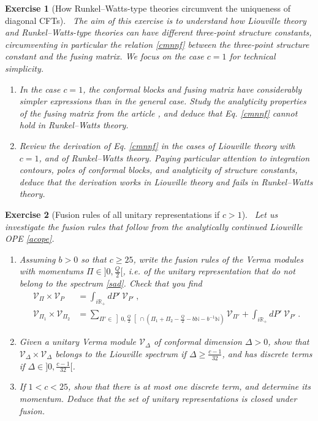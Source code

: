 \documentclass[12pt, a4paper, notitlepage, twoside]{report}
\numberwithin{equation}{section}
\theoremstyle{break}
\newtheorem{exo}{Exercise}[chapter]
\begin{document}
\begin{exo}[How Runkel--Watts-type theories circumvent the uniqueness of diagonal CFTs]
 ~\label{exonurw}
The aim of this exercise is to understand how Liouville theory and Runkel--Watts-type theories can have different three-point structure constants, circumventing in particular the relation \eqref{cmnnf} between the three-point structure constant and the fusing matrix. We focus on the case $c=1$ for technical simplicity. 
\begin{enumerate}
 \item In the case $c=1$, the conformal blocks and fusing matrix have considerably simpler expressions than in the general case. Study the analyticity properties of the fusing matrix from the article \cite{ilt13}, and deduce that Eq. \eqref{cmnnf} cannot hold in Runkel--Watts theory. 
 \item Review the derivation of Eq. \eqref{cmnnf} in the cases of Liouville theory with $c=1$, and of Runkel--Watts theory. Paying particular attention to integration contours, poles of conformal blocks, and analyticity of structure constants, deduce that the derivation works in Liouville theory and fails in Runkel--Watts theory.
\end{enumerate}
\end{exo}



\begin{exo}[Fusion rules of all unitary representations if $c>1$]
 ~\label{exoaur}
 Let us investigate the fusion rules that follow from the analytically continued Liouville OPE \eqref{acope}.
 \begin{enumerate}
  \item Assuming $b>0$ so that $c\geq 25$, write the fusion rules of the Verma modules with momentums $\Pi\in ]0,\frac{Q}{2}[$, i.e. of the unitary representation that do not belong to the spectrum \eqref{sad}.  Check that you find
\begin{align}
 \mathcal{V}_\Pi \times \mathcal{V}_P  
&= \int_{i\mathbb{R}_+} dP'\ \mathcal{V}_{P'}\ ,
\\
 \mathcal{V}_{\Pi_1} \times \mathcal{V}_{\Pi_2} 
&= \sum_{\Pi'\in \left]0,\frac{Q}{2}\right[\cap \left(\Pi_1+\Pi_2 -\frac{Q}{2}- b\mathbb{N}-b^{-1}\mathbb{N}\right)} \mathcal{V}_{\Pi'}  
+ \int_{i\mathbb{R}_+} dP'\ \mathcal{V}_{P'}\ .
\end{align}
\item Given a unitary Verma module $\mathcal{V}_\Delta$ of conformal dimension $\Delta>0$, show that $\mathcal{V}_\Delta \times \mathcal{V}_\Delta$ belongs to the Liouville spectrum if $\Delta \geq \frac{c-1}{32}$, and has discrete terms if $\Delta \in ]0,\frac{c-1}{32}[$.
\item If $1<c<25$, show that there is at most one discrete term, and determine its momentum. Deduce that the set of unitary representations is closed under fusion.
 \end{enumerate}
\end{exo}
\end{document}
